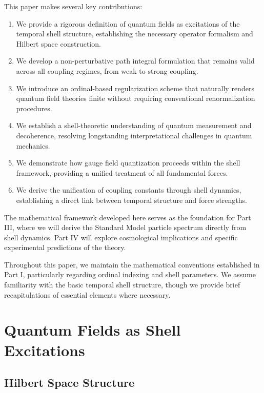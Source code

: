 \documentclass[12pt,a4paper]{article}
\begin{document}
This paper makes several key contributions:

\begin{enumerate}
    \item We provide a rigorous definition of quantum fields as excitations of the temporal shell structure, establishing the necessary operator formalism and Hilbert space construction.
    
    \item We develop a non-perturbative path integral formulation that remains valid across all coupling regimes, from weak to strong coupling.
    
    \item We introduce an ordinal-based regularization scheme that naturally renders quantum field theories finite without requiring conventional renormalization procedures.
    
    \item We establish a shell-theoretic understanding of quantum measurement and decoherence, resolving longstanding interpretational challenges in quantum mechanics.
    
    \item We demonstrate how gauge field quantization proceeds within the shell framework, providing a unified treatment of all fundamental forces.
    
    \item We derive the unification of coupling constants through shell dynamics, establishing a direct link between temporal structure and force strengths.
\end{enumerate}

The mathematical framework developed here serves as the foundation for Part III, where we will derive the Standard Model particle spectrum directly from shell dynamics. Part IV will explore cosmological implications and specific experimental predictions of the theory.

Throughout this paper, we maintain the mathematical conventions established in Part I, particularly regarding ordinal indexing and shell parameters. We assume familiarity with the basic temporal shell structure, though we provide brief recapitulations of essential elements where necessary.

\section{Quantum Fields as Shell Excitations}
\label{sec:quantum-fields}

\subsection{Hilbert Space Structure}
\label{subsec:hilbert-space}
\end{document}
